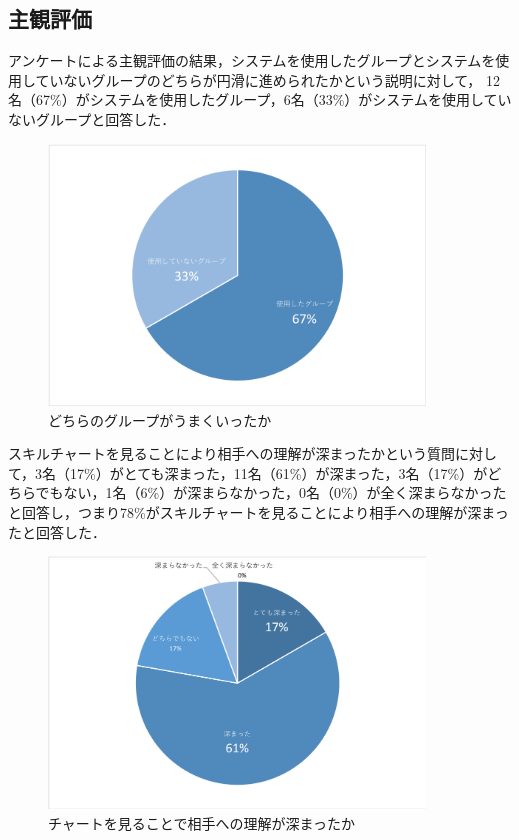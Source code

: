 \documentclass{funthesis}
\begin{document}
\subsection{主観評価}
アンケートによる主観評価の結果，システムを使用したグループとシステムを使用していないグループのどちらが円滑に進められたかという説明に対して，
12名（67\%）がシステムを使用したグループ，6名（33\%）がシステムを使用していないグループと回答した．
\begin{figure}[H]
 \centering
   \includegraphics[width=100mm]{honhon0.png}
 \caption{どちらのグループがうまくいったか}
 \label{testtest}
\end{figure}

スキルチャートを見ることにより相手への理解が深まったかという質問に対して，3名（17\%）がとても深まった，11名（61\%）が深まった，3名（17\%）がどちらでもない，1名（6\%）が深まらなかった，0名（0\%）が全く深まらなかったと回答し，つまり78\%がスキルチャートを見ることにより相手への理解が深まったと回答した．
\begin{figure}[H]
 \centering
   \includegraphics[width=100mm]{honban2.png}
 \caption{チャートを見ることで相手への理解が深まったか}
 \label{testtest}
\end{figure}
\end{document}
